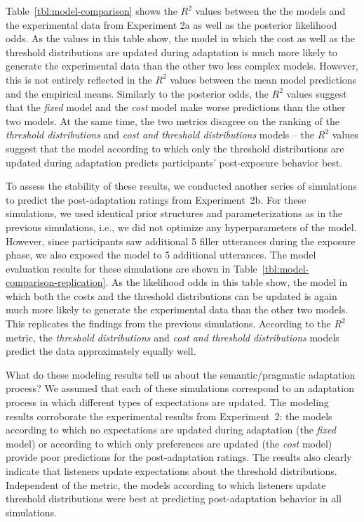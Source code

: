 \documentclass[man, floatsintext]{apa6}
\begin{document}
Table~\ref{tbl:model-comparison} shows the $R^2$ values between the the models and the experimental data from Experiment 2a 
as well as the posterior likelihood odds. As the values in this table show, the model in which the cost as well as the threshold 
 distributions are updated during adaptation is much more likely to generate the experimental data than the other 
 two less complex models. However, this is not entirely reflected in the $R^2$ values between the mean model predictions
 and the empirical means. Similarly to the posterior odds, the $R^2$ values suggest that the \textit{fixed} model
 and the \textit{cost} model make worse predictions than the other two models. At the same time, the two metrics disagree on the 
 ranking of the \textit{threshold distributions} and \textit{cost and threshold distributions} models -- the $R^2$ values suggest
 that the model according to which only the threshold distributions are updated during adaptation predicts 
 participants' post-exposure behavior best.
 
 To assess the stability of these results, we conducted another series of simulations to predict the post-adaptation
 ratings from Experiment~2b. For these simulations, we used identical prior structures and parameterizations as in
 the previous simulations, i.e., we did not optimize any hyperparameters of the model. However, 
 since participants saw additional 5 filler utterances during the exposure phase, we also exposed the model to 5 additional utterances. 
 The model 
evaluation results for these simulations are shown in Table~\ref{tbl:model-comparison-replication}. As the likelihood odds
in this table show, the model in which both the costs and the threshold distributions can be updated is again much more
likely to generate the experimental data than the other two models. This replicates the findings from the previous simulations.
According to the $R^2$ metric, the \textit{threshold distributions} and \textit{cost and threshold distributions} models predict
the data approximately equally well.

What do these modeling results tell us about the semantic/pragmatic adaptation process? 
We assumed that each of these simulations
correspond to an adaptation process in which different types of expectations are  updated.
The modeling results corroborate the experimental results from Experiment~2:
the models according to which no expectations are updated during adaptation (the \textit{fixed} model) 
or according to which only preferences are updated (the \textit{cost} model) provide poor predictions for the post-adaptation
ratings. The results also clearly indicate that listeners update expectations about the threshold distributions. Independent of
the metric, the models according to which listeners update threshold distributions were best at predicting post-adaptation
behavior in all simulations. 
\end{document}
